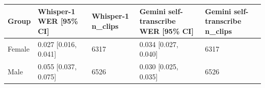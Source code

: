 \begin{tabular}{lllll}
\toprule
Group & Whisper-1 WER [95\% CI] & Whisper-1 n\_clips & Gemini self-transcribe WER [95\% CI] & Gemini self-transcribe n\_clips \\
\midrule
Female & 0.027 [0.016, 0.041] & 6317 & 0.034 [0.027, 0.040] & 6317 \\
Male & 0.055 [0.037, 0.075] & 6526 & 0.030 [0.025, 0.035] & 6526 \\
\bottomrule
\end{tabular}
